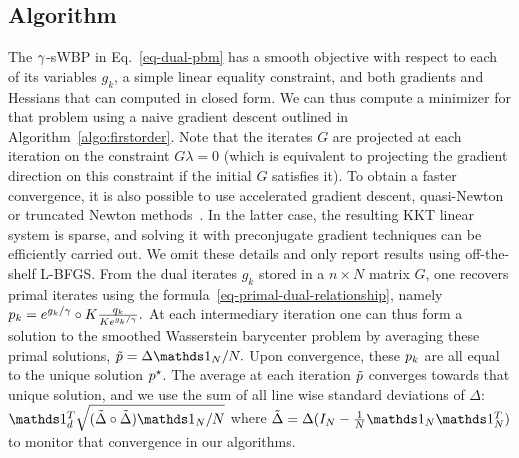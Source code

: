 % 
% 


\subsection{Algorithm}
The $\gamma$-sWBP in Eq.~\eqref{eq-dual-pbm} has a smooth objective with respect to each of its variables $g_k$, a simple linear equality constraint, and both gradients and Hessians that can computed in closed form. We can thus compute a minimizer for that problem using a naive gradient descent outlined in Algorithm~\ref{algo:firstorder}.
%
Note that the iterates $G$ are projected at each iteration on the constraint $G\lambda=0$ (which is equivalent to projecting the gradient direction on this constraint if the initial $G$ satisfies it).
%
To obtain a faster convergence, it is also possible to use accelerated gradient descent, quasi-Newton or truncated Newton methods~\cite[\S10]{Boyd:1072}. In the latter case, the resulting KKT linear system is sparse, and solving it with preconjugate gradient techniques can be efficiently carried out. We omit these details and only report results using off-the-shelf L-BFGS. From the dual iterates $g_k$ stored in a $n\times N$ matrix $G$, one recovers primal iterates using the formula~\eqref{eq-primal-dual-relationship}, namely $p_k = e^{g_k/\gamma}\circ K \frac{q_k}{Ke^{g_k/\gamma}}.$
At each intermediary iteration one can thus form a solution to the smoothed Wasserstein barycenter problem by averaging these primal solutions, $\tilde{\p} = \Delta\ones_N/N.$ Upon convergence, these $p_k$ are all equal to the unique solution $p^\star$. The average at each iteration $\tilde{p}$ converges towards that unique solution, and we use the sum of all line wise standard deviations of $\Delta$: $\ones_d^T\sqrt{(\tilde{\Delta}\circ \tilde{\Delta}) \ones_N/N}$ where $\tilde{\Delta}=\Delta(I_N-\frac{1}{N}\ones_N\ones_N^T)$ to monitor that convergence in our algorithms.

